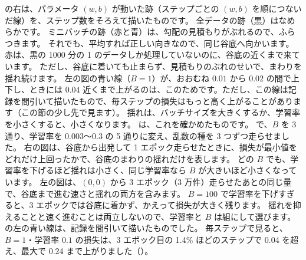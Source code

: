 の右は、パラメータ $(w,b)$ が動いた跡（ステップごとの $(w,b)$ を順につないだ線）を、ステップ数をそろえて描いたものです。
全データの跡（黒）はなめらかです。
ミニバッチの跡（赤と青）は、勾配の見積もりがぶれるので、ふらつきます。
それでも、平均すれば正しい向きなので、同じ谷底へ向かいます。
赤は、黒の 1000 分の 1 のデータしか処理していないのに、谷底の近くまで来ています。
ただし、谷底に着いても止まらず、見積もりのぶれのせいで、まわりを揺れ続けます。
左の図の青い線（$B=1$）が、おおむね $0.01$ から $0.02$ の間で上下し、ときには $0.04$ 近くまで上がるのは、このためです。ただし、この線は記録を間引いて描いたもので、毎ステップの損失はもっと高く上がることがあります（この節の少し先で見ます）。
揺れは、バッチサイズを大きくするか、学習率を小さくすると、小さくなります。
は、これを確かめたものです。
 で、$B$ を 3 通り、学習率を 0.003〜0.3 の 5 通りに変え、乱数の種を 3 つずつ走らせました。
右の図は、谷底から出発して 1 エポック走らせたときに、損失が最小値をどれだけ上回ったかで、谷底のまわりの揺れだけを表します。
どの $B$ でも、学習率を下げるほど揺れは小さく、同じ学習率なら $B$ が大きいほど小さくなっています。
左の図は、$(0,0)$ から 3 エポック（3 万件）走らせたあとの同じ量で、谷底まで進む速さと揺れの両方を含みます。
$B=100$ で学習率を下げすぎると、3 エポックでは谷底に着かず、かえって損失が大きく残ります。
揺れを抑えることと速く進むことは両立しないので、学習率と $B$ は組にして選びます。
の左の青い線は、記録を間引いて描いたものでした。
毎ステップで見ると、$B=1$・学習率 $0.1$ の損失は、3 エポック目の 1.4\% ほどのステップで 0.04 を超え、最大で 0.24 まで上がりました（）。

